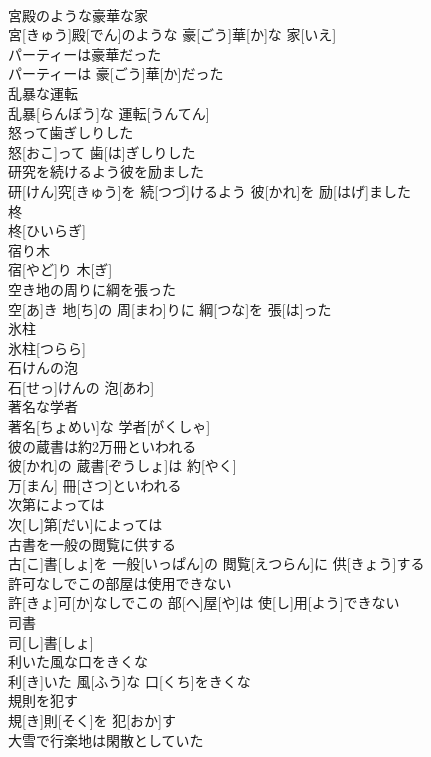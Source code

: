 \documentclass[8pt]{extreport}
\begin{document}
\begin{CJK}{UTF8}{min}
\\	宮殿のような豪華な家	
\\	宮[きゅう]殿[でん]のような 豪[ごう]華[か]な 家[いえ]
\\	パーティーは豪華だった	
\\	パーティーは 豪[ごう]華[か]だった
\\	乱暴な運転	
\\	乱暴[らんぼう]な 運転[うんてん]
\\	怒って歯ぎしりした	
\\	怒[おこ]って 歯[は]ぎしりした
\\	研究を続けるよう彼を励ました	
\\	研[けん]究[きゅう]を 続[つづ]けるよう 彼[かれ]を 励[はげ]ました
\\	柊	
\\	柊[ひいらぎ] 
\\	宿り木	
\\	宿[やど]り 木[ぎ]
\\	空き地の周りに綱を張った	
\\	空[あ]き 地[ち]の 周[まわ]りに 綱[つな]を 張[は]った
\\	氷柱	
\\	氷柱[つらら]
\\	石けんの泡	
\\	石[せっ]けんの 泡[あわ]
\\	著名な学者	
\\	著名[ちょめい]な 学者[がくしゃ]
\\	彼の蔵書は約2万冊といわれる	
\\	彼[かれ]の 蔵書[ぞうしょ]は 約[やく] 
\\	万[まん] 冊[さつ]といわれる
\\	次第によっては	
\\	次[し]第[だい]によっては
\\	古書を一般の閲覧に供する	
\\	古[こ]書[しょ]を 一般[いっぱん]の 閲覧[えつらん]に 供[きょう]する
\\	許可なしでこの部屋は使用できない	
\\	許[きょ]可[か]なしでこの 部[へ]屋[や]は 使[し]用[よう]できない
\\	司書	
\\	司[し]書[しょ]
\\	利いた風な口をきくな	
\\	利[き]いた 風[ふう]な 口[くち]をきくな
\\	規則を犯す	
\\	規[き]則[そく]を 犯[おか]す
\\	大雪で行楽地は閑散としていた	

\end{CJK}
\end{document}
